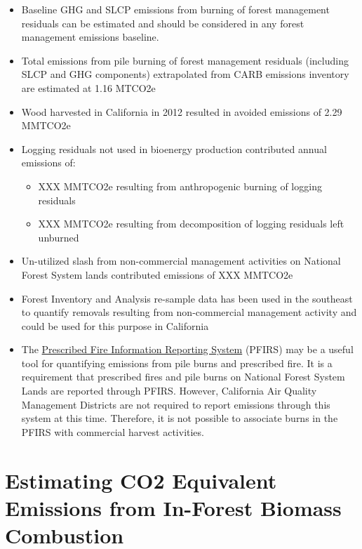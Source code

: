 \documentclass[a4paper]{article}
\begin{document}
\begin{itemize}
\item Baseline GHG and SLCP emissions from burning of forest
management residuals can be estimated and should be considered in
any forest management emissions baseline.

\item Total emissions from pile burning of forest management residuals
(including SLCP and GHG components) extrapolated from CARB emissions
inventory are estimated at 1.16 MTCO2e

\item Wood harvested in California in 2012 resulted in avoided emissions of
2.29 MMTCO2e

\item Logging residuals not used in bioenergy production contributed annual
emissions of:
\begin{itemize}
\item XXX MMTCO2e resulting from anthropogenic burning of logging residuals

\item XXX MMTCO2e resulting from decomposition of logging residuals left
unburned
\end{itemize}

\item Un-utilized slash from non-commercial management activities on
National Forest System lands contributed emissions of XXX MMTCO2e

\item Forest Inventory and Analysis re-sample data has been used in the
southeast to quantify removals resulting from non-commercial
management activity and could be used for this purpose in California

\item The \href{https://ssl.arb.ca.gov/pfirs/}{Prescribed Fire Information Reporting System} (PFIRS) may be a useful tool for quantifying
emissions from pile burns and prescribed fire. It is a requirement that prescribed fires and pile
burns on National Forest System Lands are reported through PFIRS. However, California Air Quality Management
Districts are not required to report emissions through this system at this time. Therefore, it is not possible to associate burns in the PFIRS with commercial harvest activities.
\end{itemize}

\section{Estimating CO2 Equivalent Emissions from In-Forest Biomass Combustion}
\label{sec-2}
\end{document}
